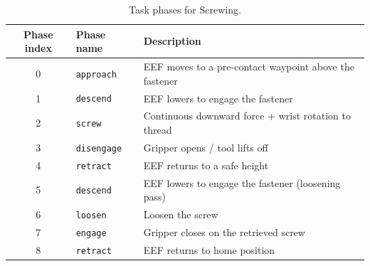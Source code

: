 \documentclass{article}
\begin{document}
\begin{table}[htbp]
    \centering
    \caption{Task phases for Screwing.}
    \label{tab:phases_screw}
    \small
    \begin{tabular}{clp{8cm}}
        \toprule
        Phase index & Phase name         & Description                                            \\
        \midrule
        0           & \texttt{approach}  & EEF moves to a pre-contact waypoint above the fastener \\
        1           & \texttt{descend}   & EEF lowers to engage the fastener                      \\
        2           & \texttt{screw}     & Continuous downward force + wrist rotation to thread   \\
        3           & \texttt{disengage} & Gripper opens / tool lifts off                         \\
        4           & \texttt{retract}   & EEF returns to a safe height                           \\
        5           & \texttt{descend}   & EEF lowers to engage the fastener (loosening pass)     \\
        6           & \texttt{loosen}    & Loosen the screw                                       \\
        7           & \texttt{engage}    & Gripper closes on the retrieved screw                  \\
        8           & \texttt{retract}   & EEF returns to home position                           \\
        \bottomrule
    \end{tabular}
\end{table}
\end{document}

